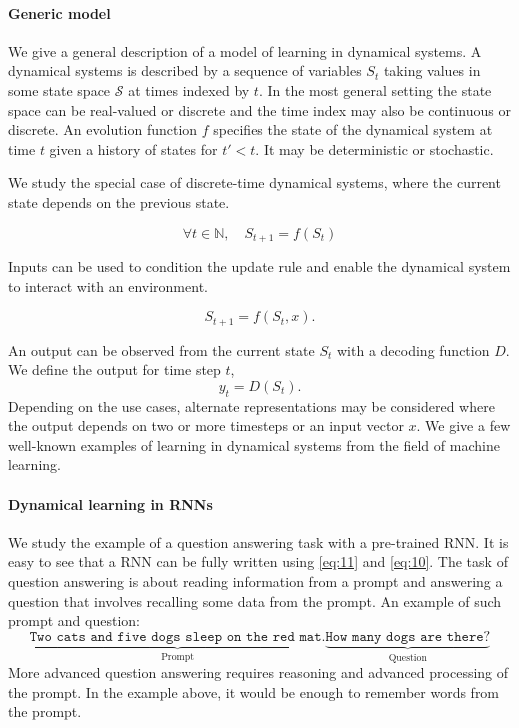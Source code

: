 \paragraph{Generic model}\label{sec:generic-model}
We give a general description of a model of learning in dynamical systems. A
dynamical systems is described by a sequence of variables $S_{t}$ taking values
in some state space $\mathcal{S}$ at times indexed by $t$. In the most general setting the
state space can be real-valued or discrete and the time index may also be
continuous or discrete. An evolution function $f$ specifies the state of the
dynamical system at time $t$ given a history of states for $t' < t$. It may be
deterministic or stochastic.

We study the special case of discrete-time dynamical systems, where the current
state depends on the previous state.

\begin{equation}
  \forall t \in \mathbb{N},\quad S_{t + 1} = f(S_{t})
  \label{eq:dyn-update}
\end{equation}

Inputs can be used to condition the update rule and enable the dynamical system
to interact with an environment.

\begin{equation}
S_{t+1} = f(S_t, x).
\label{eq:11}
\end{equation}

An output can be observed from the current state $S_t$ with a decoding function
$D$. We define the output for time step $t$,
\begin{equation}
  \label{eq:10}
  y_t = D(S_t).
\end{equation}
Depending on the use cases, alternate representations may be considered where
the output depends on two or more timesteps or an input vector $x$.
We give a few well-known examples of learning in dynamical systems from the
field of machine learning.

\paragraph{Dynamical learning in \acp{RNN}}\label{sec:dynam-learn-acprnn}
We study the example of a question answering task with a pre-trained \ac{RNN}.
It is easy to see that a \ac{RNN} can be fully written using \eqref{eq:11} and
\eqref{eq:10}. The task of question answering is about reading information from
a prompt and answering a question that involves recalling some data from the
prompt. An example of such prompt and question:
\begin{equation*}
  \underbrace{\texttt{Two cats and five dogs sleep on the red mat.}}_{\text{Prompt}}
  \underbrace{\texttt{How many dogs are there?}}_{\text{Question}}
\end{equation*}
More advanced question answering requires reasoning and advanced processing of
the prompt. In the example above, it would be enough to remember words from the
prompt.

